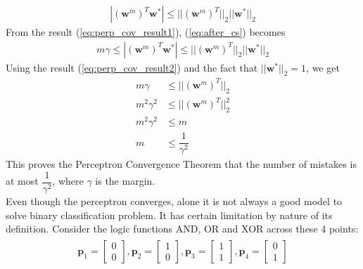 \begin{align}
  \label{eq:after_cs}
  |(\textbf{w}^{m})^T\textbf{w}^{*}| \leq ||(\textbf{w}^{m})^T||_2  ||\textbf{w}^{*}||_2
\end{align}
From the result (\ref{eq:perp_cov_result1}), (\ref{eq:after_cs}) becomes
\begin{align}
  m\gamma \leq |(\textbf{w}^{m})^T\textbf{w}^{*}| \leq ||(\textbf{w}^{m})^T||_2  ||\textbf{w}^{*}||_2
\end{align}
Using the result (\ref{eq:perp_cov_result2}) and the fact that $||\textbf{w}^{*}||_{2} = 1$, we get
\begin{align}
  \nonumber
  m\gamma &\leq ||(\textbf{w}^{m})^T||_2 \\
  m^2 {\gamma}^2 &\leq ||(\textbf{w}^{m})^T||_{2}^{2} \\
  m^2 {\gamma}^2 &\leq m \\
  m &\leq \dfrac{1}{\gamma^2}
\end{align}
This proves the Perceptron Convergence Theorem that the number of mistakes is at most $\dfrac{1}{\gamma^2}$, where $\gamma$ is the margin.\vspace*{5mm}\\
Even though the perceptron converges, alone it is not always a good model to solve binary classification problem. It has certain limitation by nature of its definition. Consider the logic functions AND, OR and XOR across these 4 points:
\begin{align}
  \begin{matrix}
    \textbf{p}_1 = \begin{bmatrix}
      0 \\
      0
    \end{bmatrix},
    \textbf{p}_2 = \begin{bmatrix}
      1 \\
      0
    \end{bmatrix},
    \textbf{p}_3 = \begin{bmatrix}
      1 \\
      1
    \end{bmatrix},
    \textbf{p}_4 = \begin{bmatrix}
      0 \\
      1
    \end{bmatrix}  
  \end{matrix}
\end{align}
